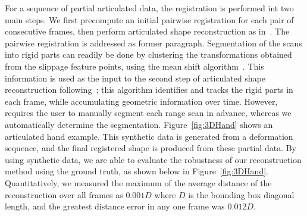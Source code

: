For a sequence of partial articulated data, the registration is performed int two main steps.
We first precompute an initial pairwise registration for each pair of consecutive frames, then perform articulated shape reconstruction as in~\cite{Pekelny08}. 
The pairwise registration is addressed as former paragraph.
Segmentation of the scans into rigid parts can readily be done by clustering the transformations obtained from the slippage feature points, 
using the mean shift algorithm~\cite{Comaniciu02}.
This information is used as the input to the second step of articulated shape reconstruction following~\cite{Pekelny08};
this algorithm identifies and tracks the rigid parts in each frame, while accumulating  geometric information over time.
However,~\cite{Pekelny08} requires the user to manually segment each range scan in advance,  whereas we automatically determine  the segmentation.
Figure~\ref{fig:3DHand} shows an articulated hand example.
This synthetic data is generated from a deformation sequence, and the final registered shape is produced from these partial data. 
By using synthetic data, we are able to evaluate the robustness of our reconstruction method using the ground truth, as shown below in Figure~\ref{fig:3DHand}.
Quantitatively, we measured the maximum of the average distance of the reconstruction over all frames as $0.001 D$ where $D$ is the bounding box diagonal length, and
the greatest distance error in any one frame was $0.012 D$.

